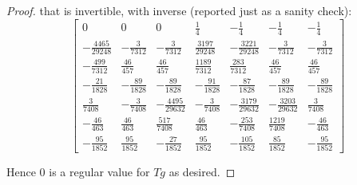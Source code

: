\documentclass[9pt]{article}
\begin{document}
\begin{proof}
  that is invertible, with inverse (reported  just as a sanity check):
  \[
    \left[
      \begin{matrix}
        0 & 0 & 0 & \frac{1}{4} & - \frac{1}{4} & - \frac{1}{4} & - \frac{1}{4}\\
        - \frac{4465}{29248} & - \frac{3}{7312} & - \frac{3}{7312} & \frac{3197}{29248} & - \frac{3221}{29248} & - \frac{3}{7312} & - \frac{3}{7312}\\
        - \frac{499}{7312} & \frac{46}{457} & \frac{46}{457} & \frac{1189}{7312} & \frac{283}{7312} & \frac{46}{457} & \frac{46}{457}\\
        - \frac{21}{1828} & - \frac{89}{1828} & - \frac{89}{1828} & - \frac{91}{1828} & - \frac{87}{1828} & - \frac{89}{1828} & - \frac{89}{1828}\\
        \frac{3}{7408} & - \frac{3}{7408} & - \frac{4495}{29632} & - \frac{3}{7408} & - \frac{3179}{29632} & - \frac{3203}{29632} & \frac{3}{7408}\\
        - \frac{46}{463} & \frac{46}{463} & \frac{517}{7408} & \frac{46}{463} & - \frac{253}{7408} & \frac{1219}{7408} & - \frac{46}{463}\\
        - \frac{95}{1852} & \frac{95}{1852} & - \frac{27}{1852} & \frac{95}{1852} & - \frac{105}{1852} & \frac{85}{1852} & - \frac{95}{1852}
      \end{matrix}
    \right]
  \]

Hence $0$ is a regular value for $Tg$ as desired.
\end{proof}
\printbibliography
\end{document}
